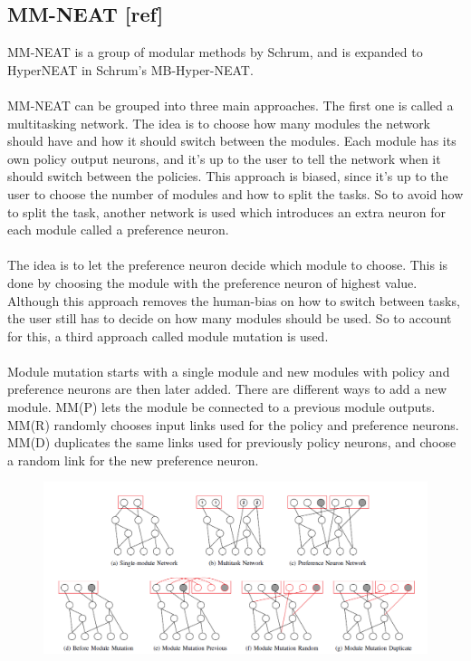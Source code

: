 \subsection{MM-NEAT [ref]}
MM-NEAT is a group of modular methods by Schrum, and is expanded to HyperNEAT in Schrum's MB-Hyper-NEAT.
\\ 
\\
MM-NEAT can be grouped into three main approaches. The first one is called a multitasking network. The idea is to choose how many modules the network should have and how it should switch between the modules. Each module has its own policy output neurons, and it’s up to the user to tell the network when it should switch between the policies. This approach is biased, since it’s up to the user to choose the number of modules and how to split the tasks. So to avoid how to split the task, another network is used which introduces an extra neuron for each module called a preference neuron. 
\\ 
\\
The idea is to let the preference neuron decide which module to choose. This is done by choosing the module with the preference neuron of highest value. Although this approach removes the human-bias on how to switch between tasks, the user still has to decide on how many modules should be used. So to account for this, a third approach called module mutation is used.
\\ 
\\
Module mutation starts with a single module and new modules with policy and preference neurons are then later added. There are different ways to add a new module. MM(P) lets the module be connected to a previous module outputs. MM(R) randomly chooses input links used for the policy and preference neurons. MM(D) duplicates the same links used for previously policy neurons, and choose a random link for the new preference neuron.
\begin{figure}[!ht]
\centering
\includegraphics[scale=0.45]{MM-NEAT}
\caption{}
\end{figure}
